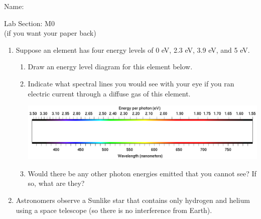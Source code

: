 \documentclass[12pt]{article}
\begin{document}
\Large
\centerline{}

\vspace{1em}


\begin{minipage}{0.6\textwidth}
	Name: \underline{\hspace{3in}}
\end{minipage}
\begin{minipage}{0.4\textwidth}
	\Large
	Lab Section: M0\underline{\hspace{1in}}\\
	\small (if you want your paper back)
\end{minipage}


\normalsize

	\rm
	
	\begin{enumerate}
		\item Suppose an element has four energy levels of 0 eV, 2.3 eV, 3.9 eV, and  5 eV. 
		
		\begin{enumerate}
			\item Draw an energy level diagram for this element below.
			
			\vspace{4in}
			
			\item Indicate what spectral lines you would see with your eye if you ran electric current through a diffuse gas of this element.
			
			\begin{minipage}{\textwidth}

				\includegraphics[width=5.5in]{spectrum-blank.png}

			\end{minipage}
			
			\item Would there be any other photon energies emitted that you cannot see? If so, what are they?
		\end{enumerate}
	
	\newpage
	
	\item Astronomers observe a Sunlike star that contains only hydrogen and helium using a space telescope (so there is no interference from Earth).
	

\end{enumerate}
\end{document}
